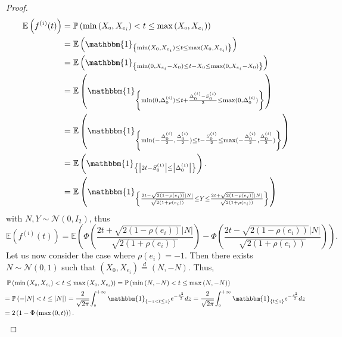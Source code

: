 \documentclass[12pt]{article}
\theoremstyle{Theorem}
\begin{document}
\begin{proof}
{\begin{align*}
\mathbb{E}\left(f^{(i)}(t)\right) & = \mathbb{P}\left(\min\left(X_{\scriptscriptstyle 0}, X_{e_i}\right) < t \leq \max\left(X_{\scriptscriptstyle 0}, X_{e_i}\right)\right) \\
& = \mathbb{E}\left(\mathbbm{1}_{\left\{\min(X_{\scriptscriptstyle 0}, X_{e_i}) \leq t \leq \max(X_{\scriptscriptstyle 0}, X_{e_i})\right\}}\right) \\
&= \mathbb{E}\left(\mathbbm{1}_{\left\{\min(0, X_{e_i} -X_{\scriptscriptstyle 0}) \leq t -X_{\scriptscriptstyle 0}\leq \max(0, X_{e_i}-X_{0})\right\}}\right) \\
& = \mathbb{E}\left(\mathbbm{1}_{\left\{\min(0, \Delta^{\scriptscriptstyle (i)}_{\scriptscriptstyle 0}) \leq t + \frac{\Delta^{\scriptscriptstyle (i)}_{\scriptscriptstyle 0} - S^{\scriptscriptstyle (i)}_{\scriptscriptstyle 0}}{2}\leq \max(0, \Delta^{\scriptscriptstyle (i)}_{\scriptscriptstyle 0})\right\}}\right) \\
& = \mathbb{E}\left(\mathbbm{1}_{\left\{\min(-\frac{\Delta^{\scriptscriptstyle (i)}_{\scriptscriptstyle 0}}{2}, \frac{\Delta^{\scriptscriptstyle (i)}_{\scriptscriptstyle 0}}{2}) \leq t - \frac{S^{\scriptscriptstyle (i)}_{\scriptscriptstyle 0}}{2}\leq \max(-\frac{\Delta^{\scriptscriptstyle (i)}_{\scriptscriptstyle 0}}{2}, \frac{\Delta^{\scriptscriptstyle (i)}_{\scriptscriptstyle 0}}{2})\right\}}\right) \\
& = \mathbb{E}\left(\mathbbm{1}_{\left\{ \left|2t - S^{\scriptscriptstyle (1)}_{\scriptscriptstyle 0}\right| \leq \left|\Delta^{\scriptscriptstyle (1)}_{\scriptscriptstyle 0}\right|\right\}}\right). \\
& = \mathbb{E}\left(\mathbbm{1}_{\left\{\frac{2t - \sqrt{2(1-\rho(e_i))}|N|}{\sqrt{2(1+\rho(e_i))}}  \leq Y \leq \frac{2t + \sqrt{2(1-\rho(e_i))}|N|}{\sqrt{2(1+\rho(e_i))}}\right\}}\right)
\end{align*}}  
with $N, Y \sim \mathcal{N}(0,I_{2})$, thus 
$$\mathbb{E}\left(f^{(i)}(t)\right) = \mathbb{E}\left(\Phi\left(\dfrac{2t + \sqrt{2(1-\rho(e_i))}|N|}{\sqrt{2(1+\rho(e_i))}}\right)  - \Phi\left(\dfrac{2t - \sqrt{2(1-\rho(e_i))}|N|}{\sqrt{2(1+\rho(e_i))}}\right)\right).$$
Let us now consider the case where $\rho(e_i) = -1$. Then there exists $N \sim \mathcal{N}\left(0,1\right)$ such that $\left(X_{\scriptscriptstyle 0}, X_{e_i}\right) \overset{d}{=} \left(N, -N\right)$. Thus, 
\begin{align*}
\mathbb{P}\left(\min\left(X_{\scriptscriptstyle 0}, X_{e_i}\right) < t \leq \max\left(X_{\scriptscriptstyle 0}, X_{e_i}\right)\right) & = \mathbb{P}\left(\min\left(N, -N\right) < t \leq \max\left(N, -N\right)\right) \\
& \hspace{-6cm}= \mathbb{P}\left(-|N| < t \leq |N|\right) = \cfrac{2}{\sqrt{2\pi}} \int_{\scriptscriptstyle 0}^{+\infty} \mathbbm{1}_{\left\{-z < t \leq z\right\}} e^{-\frac{z^2}{2}}dz  = \cfrac{2}{\sqrt{2\pi}} \int_{\scriptscriptstyle 0}^{+\infty} \mathbbm{1}_{\left\{t \leq z\right\}} e^{-\frac{z^2}{2}}dz \\
& \hspace{-6cm}= 2\left(1 - \Phi\left(\max\left(0,t\right)\right)\right).
\end{align*}
\end{proof}
\end{document}
